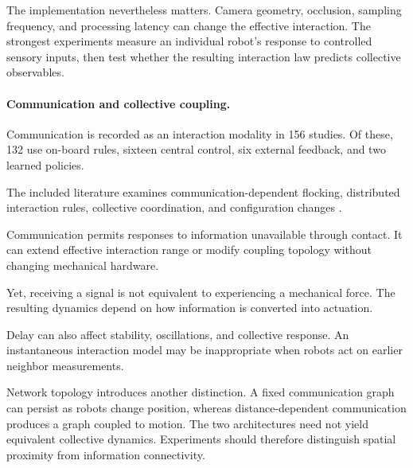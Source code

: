 The implementation nevertheless matters.
Camera geometry, occlusion, sampling frequency,
and processing latency can change the
effective interaction. The strongest
experiments measure an individual robot's
response to controlled sensory inputs,
then test whether the resulting interaction
law predicts collective observables.

\paragraph*{Communication and collective coupling.}

Communication is recorded as an interaction
modality in 156 studies. Of these, 132 use
on-board rules, sixteen central control,
six external feedback, and two
learned policies.

The included literature examines
communication-dependent flocking,
distributed interaction rules,
collective coordination, and
configuration changes
\cite{Cianci2007communicationinas,Christensen2008swarmorphscripta,Ferrante2013aselfadaptivecomm,Valentini2015collectivedecision,Kernbach2011threecasesofconne,Drew2021acousticcommunicati,Cazenille2024hearingtheshapeof,Gao2023robustdistributedc,Lee2022distributedcohesive,Zhou2024anticipationpromote,Turgut2008selforganizedflocka,Vsrhelyi2018optimizedflockingo,Tran2022frontierledswarmin,Maffettone2024mixedrealityenviro,Santos2014cohesionandsegrega,Min2011designandanalysis,Beattie2025realizingemergentc,MendozaRobles2026distributedformatio}.

Communication permits responses to
information unavailable through contact.
It can extend effective interaction range
or modify coupling topology without
changing mechanical hardware.

Yet, receiving a signal is not equivalent
to experiencing a mechanical force.
The resulting dynamics depend on how
information is converted into actuation.

Delay can also affect stability,
oscillations, and collective response.
An instantaneous interaction model
may be inappropriate when robots
act on earlier neighbor measurements.

Network topology introduces another
distinction. A fixed communication graph
can persist as robots change position,
whereas distance-dependent communication
produces a graph coupled to motion.
The two architectures need not yield
equivalent collective dynamics.
Experiments should therefore distinguish
spatial proximity from information
connectivity.

